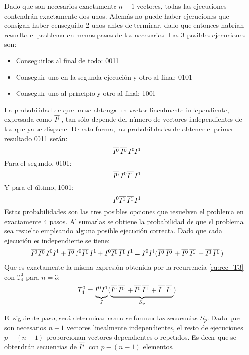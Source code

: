 Dado que son necesarios exactamente $n-1$ vectores, todas las ejecuciones 
contendrán exactamente dos unos.  Además no puede haber ejecuciones que consigan 
haber conseguido 2 unos antes de terminar, dado que entonces habrían resuelto el 
problema en menos pasos de los necesarios.  Las 
3 posibles ejecuciones son:
\begin{itemize}
\item Conseguirlos al final de todo: 0011
\item Conseguir uno en la segunda ejecución y otro al final: 0101
\item Conseguir uno al principio y otro al final: 1001
\end{itemize}
La probabilidad de que no se obtenga un vector linealmente independiente, 
expresada como $\overline{I^{i}}\,$, tan sólo depende del número de vectores independientes 
de los que ya se dispone. De esta forma, las probabilidades de obtener el primer 
resultado 0011 serán:
$$ \overline{I^{0}}\, \overline{I^{0}}\, I^0 I^1 $$
Para el segundo, 0101:
$$ \overline{I^{0}}\, I^0 \overline{I^{1}}\, I^1 $$
Y para el último, 1001:
$$ I^0 \overline{I^{1}}\, \overline{I^{1}}\, I^1 $$
Estas probabilidades son las tres posibles opciones que resuelven el problema en 
exactamente 4 pasos. Al sumarlas se obtiene la probabilidad de que el problema 
sea resuelto empleando alguna posible ejecución correcta. Dado que cada 
ejecución es independiente se tiene:
\begin{equation}
\begin{split}
\overline{I^{0}}\, \overline{I^{0}}\, I^0 I^1 + \overline{I^{0}}\, I^0 \overline{I^{1}}\, I^1 + I^0 \overline{I^{1}}\, \overline{I^{1}}\, I^1 =
I^0I^1(\overline{I^{0}}\, \overline{I^{0}}\, + \overline{I^{0}}\, \overline{I^{1}}\,  + \overline{I^{1}}\, \overline{I^{1}}\, )
\end{split}
\end{equation}
Que es exactamente la misma expresión obtenida por la recurrencia 
\eqref{eq:rec_T3} con $T^0_4$ para $n=3$:
%
$$
	T^0_4 = \underbrace{
\vphantom{\big(}
I^0I^1
}_J
	(\underbrace{
\vphantom{\big(}
\overline{I^{0}}\, \overline{I^{0}}\, + \overline{I^{0}}\, \overline{I^{1}}\,  + \overline{I^{1}}\, \overline{I^{1}}\,
}_{S_p}) $$
%

El siguiente paso, será determinar como se forman las secuencias $S_p$.
Dado que son necesarios $n-1$ vectores linealmente independientes, el resto de 
ejecuciones $p - (n-1)$ proporcionan vectores dependientes o repetidos. Es decir 
que se obtendrán secuencias de $\overline{I^{i}}\,$ con $p - (n-1)$ elementos.

